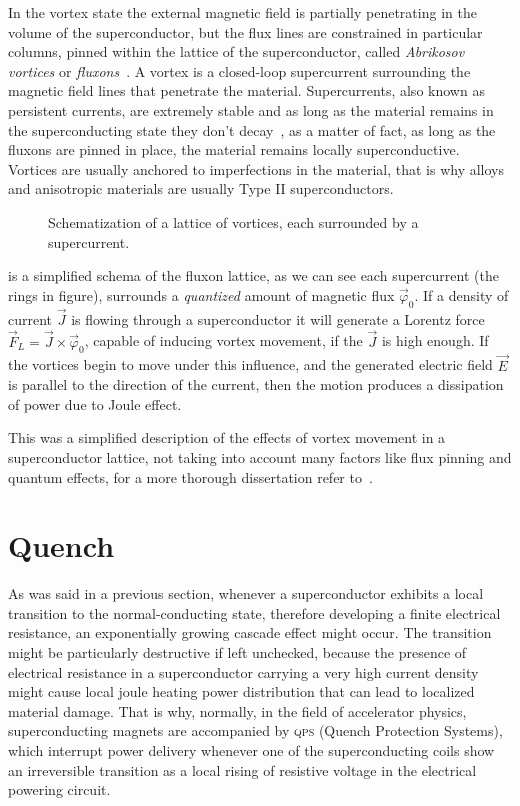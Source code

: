 In the vortex state the external magnetic field is partially penetrating in the volume of the superconductor, but the
flux lines are constrained in particular columns, pinned within the lattice of the
superconductor, called \emph{Abrikosov vortices} or \emph{fluxons}~\cite{abrikosov-vortices}.
A vortex is a closed-loop supercurrent surrounding the magnetic field lines that
penetrate the material. Supercurrents, also known as persistent currents, are extremely stable and as long as the material remains in the
superconducting state they don't decay~\cite{fujita-theory-HTS, file1963}, as a matter of fact, as long as the
fluxons are pinned in place, the material remains locally superconductive. Vortices are usually anchored to imperfections in the material, that is why alloys and anisotropic materials are usually Type II superconductors.

\begin{figure}[!ht]
	\centering
	
	\caption{Schematization of a lattice of vortices, each surrounded by a
		supercurrent.}
	\label{fig:abrikosov-lattice}
\end{figure}

 is a simplified schema of the fluxon lattice, as we can see each
supercurrent (the rings in figure), surrounds a \emph{quantized} amount of magnetic flux
$\vec{\varphi}_0$. If a density of current $\vec{J}$ is flowing through a superconductor it will
generate a Lorentz force $\vec{F}_L = \vec{J} \times \vec{\varphi}_0$, capable of inducing vortex
movement, if the $\vec{J}$ is high enough. If the vortices begin to move under this influence, and
the generated electric field $\vec{E}$ is parallel to the direction of the current, then the motion
produces a dissipation of power due to Joule effect.

This was a simplified description of the effects of vortex movement in a superconductor lattice, not
taking into account many factors like flux pinning and quantum effects, for a more thorough
dissertation refer to~\cite{huebener2019}.

\section{Quench}
As was said in a previous section, whenever a superconductor exhibits a local transition to the
normal-conducting state, therefore developing a finite electrical resistance, an exponentially
growing cascade effect might occur. The transition might be particularly destructive if left
unchecked, because the presence of electrical resistance in a superconductor carrying a very high
current density might cause local joule heating power distribution that can lead to localized
material damage. That is why, normally, in the field of accelerator physics, superconducting magnets
are accompanied by \textsc{qps} (Quench Protection Systems), which interrupt power delivery whenever
one of the superconducting coils show an irreversible transition as a local rising of resistive
voltage in the electrical powering circuit.
